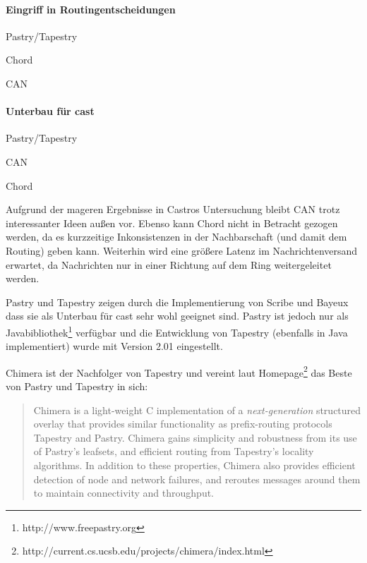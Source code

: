 \begin{multicols}{2}
\paragraph{Eingriff in Routingentscheidungen}
\begin{enumerate*}
\item Pastry/Tapestry
\item Chord
\item CAN
\end{enumerate*}

\paragraph{Unterbau für \ac{cast}}
\begin{enumerate*}
\item Pastry/Tapestry
\item CAN
\item Chord
\end{enumerate*}


\end{multicols}

Aufgrund der mageren Ergebnisse in Castros Untersuchung \cite{Castro2003Evaluation} bleibt CAN trotz interessanter Ideen außen vor. Ebenso kann Chord nicht in Betracht gezogen werden, da es kurzzeitige Inkonsistenzen in der Nachbarschaft (und damit dem Routing) geben kann. Weiterhin wird eine größere Latenz im Nachrichtenversand erwartet, da Nachrichten nur in einer Richtung auf dem Ring weitergeleitet werden.

Pastry und Tapestry zeigen durch die Implementierung von Scribe und Bayeux \cite{Castro2002Scribe, Zhuang2001} dass sie als Unterbau für \ac{cast} sehr wohl geeignet sind. Pastry ist jedoch nur als Javabibliothek\footnote{http://www.freepastry.org} verfügbar und die Entwicklung von Tapestry (ebenfalls in Java implementiert) wurde mit Version 2.01 eingestellt.

Chimera ist der Nachfolger von Tapestry und vereint laut Homepage\footnote{http://current.cs.ucsb.edu/projects/chimera/index.html} das Beste von Pastry und Tapestry in sich: 

\begin{quote}
Chimera is a light-weight C implementation of a \emph{next-generation} structured overlay that provides similar functionality as prefix-routing protocols Tapestry and Pastry.  Chimera gains simplicity and robustness from its use of Pastry's leafsets, and efficient routing from Tapestry's locality algorithms.  In addition to these properties, Chimera also provides efficient detection of node and network failures, and reroutes messages around them to maintain connectivity and throughput.  
\end{quote}

